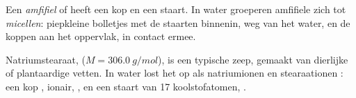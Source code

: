 \begin{definition}\label{def:g11:dissolution:amphiphilic}
Een \emph{amfifiel}  of  heeft een 
kop en een  staart. In water groeperen amfifiele  zich tot
\emph{micellen}: piepkleine bolletjes met de staarten
binnenin, weg van het water, en de koppen aan het oppervlak, in contact
ermee.
\end{definition}

\begin{example}\label{ex:g11:dissolution:soap}
Natriumstearaat,  ($M = \qty{306.0}{g/mol}$), is een
typische zeep, gemaakt van dierlijke of plantaardige vetten. In water
lost het op als natriumionen  en stearaationen :
een kop , ionair, , en een staart van 17
koolstofatomen, .
\end{example}

